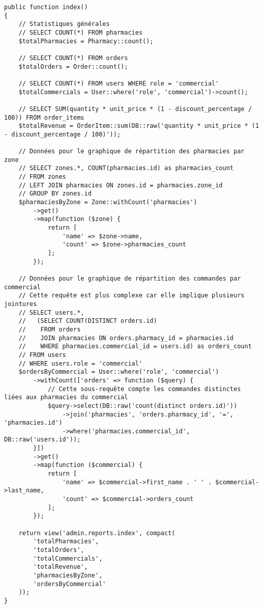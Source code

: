 \documentclass[12pt,a4paper]{article}
\begin{document}
\begin{lstlisting}[caption=Méthode index du ReportController]
public function index()
{
    // Statistiques générales
    // SELECT COUNT(*) FROM pharmacies
    $totalPharmacies = Pharmacy::count();
    
    // SELECT COUNT(*) FROM orders
    $totalOrders = Order::count();
    
    // SELECT COUNT(*) FROM users WHERE role = 'commercial'
    $totalCommercials = User::where('role', 'commercial')->count();
    
    // SELECT SUM(quantity * unit_price * (1 - discount_percentage / 100)) FROM order_items
    $totalRevenue = OrderItem::sum(DB::raw('quantity * unit_price * (1 - discount_percentage / 100)'));
    
    // Données pour le graphique de répartition des pharmacies par zone
    // SELECT zones.*, COUNT(pharmacies.id) as pharmacies_count 
    // FROM zones
    // LEFT JOIN pharmacies ON zones.id = pharmacies.zone_id
    // GROUP BY zones.id
    $pharmaciesByZone = Zone::withCount('pharmacies')
        ->get()
        ->map(function ($zone) {
            return [
                'name' => $zone->name,
                'count' => $zone->pharmacies_count
            ];
        });
    
    // Données pour le graphique de répartition des commandes par commercial
    // Cette requête est plus complexe car elle implique plusieurs jointures
    // SELECT users.*, 
    //   (SELECT COUNT(DISTINCT orders.id) 
    //    FROM orders 
    //    JOIN pharmacies ON orders.pharmacy_id = pharmacies.id 
    //    WHERE pharmacies.commercial_id = users.id) as orders_count
    // FROM users
    // WHERE users.role = 'commercial'
    $ordersByCommercial = User::where('role', 'commercial')
        ->withCount(['orders' => function ($query) {
            // Cette sous-requête compte les commandes distinctes liées aux pharmacies du commercial
            $query->select(DB::raw('count(distinct orders.id)'))
                ->join('pharmacies', 'orders.pharmacy_id', '=', 'pharmacies.id')
                ->where('pharmacies.commercial_id', DB::raw('users.id'));
        }])
        ->get()
        ->map(function ($commercial) {
            return [
                'name' => $commercial->first_name . ' ' . $commercial->last_name,
                'count' => $commercial->orders_count
            ];
        });
    
    return view('admin.reports.index', compact(
        'totalPharmacies',
        'totalOrders',
        'totalCommercials',
        'totalRevenue',
        'pharmaciesByZone',
        'ordersByCommercial'
    ));
}
\end{lstlisting}
\end{document}
